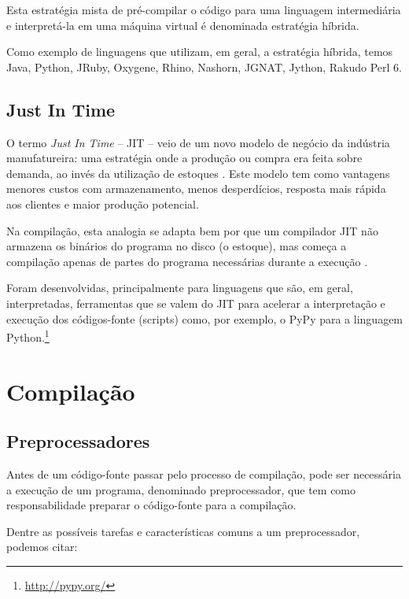 Esta estratégia mista de pré-compilar o código para uma linguagem 
intermediária e interpretá-la em uma máquina virtual é denominada 
estratégia híbrida. 

Como exemplo de linguagens que utilizam, em geral, a estratégia híbrida, temos 
 Java, Python, JRuby, Oxygene, Rhino, Nashorn, JGNAT, Jython, Rakudo Perl 6.

\subsection{Just In Time}

O termo \textit{Just In Time} -- JIT -- veio de um novo modelo de  negócio da
 indústria manufatureira: uma estratégia onde a produção 
ou compra era feita sobre demanda, ao invés da utilização de estoques
 \cite[pág. 177]{ref10}. 
Este modelo tem como vantagens menores custos com armazenamento, 
menos desperdícios, resposta mais rápida aos clientes e maior 
produção potencial.

Na compilação, esta analogia se adapta bem por que um compilador JIT 
não armazena os binários do programa no disco (o estoque), mas começa 
a compilação apenas de partes do programa necessárias durante a execução
 \cite[pág. 8]{ref2}.

Foram desenvolvidas, principalmente para linguagens que são, em geral, 
interpretadas, ferramentas que se valem do JIT para acelerar a interpretação
 e execução dos códigos-fonte (scripts) como, 
por exemplo, o PyPy para a linguagem Python.\footnote{\url{http://pypy.org/}}


\section{Compilação}

\subsection{Preprocessadores}


Antes de um código-fonte passar pelo processo de compilação, pode ser
 necessária a execução de um programa, denominado preprocessador, que
 tem como responsabilidade preparar o código-fonte para a compilação. 

Dentre as possíveis tarefas e características comuns a um preprocessador,
 podemos citar:

